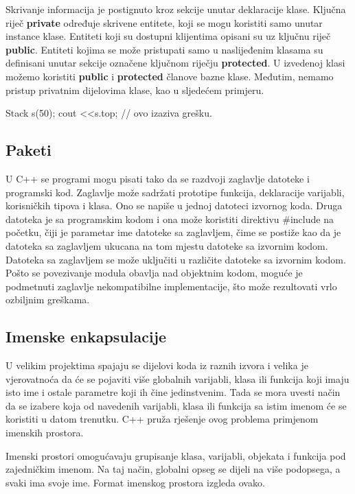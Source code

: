 \documentclass[11pt]{book}
\begin{document}
Skrivanje informacija je postignuto kroz sekcije unutar deklaracije klase. Ključna riječ \textbf{private} određuje skrivene entitete, koji se mogu koristiti samo unutar instance klase. Entiteti koji su dostupni klijentima opisani su uz ključnu riječ \textbf{public}. Entiteti kojima se može pristupati samo u naslijeđenim klasama su definisani unutar sekcije označene ključnom riječju \textbf{protected}.  U izvedenoj klasi možemo koristiti \textbf{public} i \textbf{protected} članove bazne klase.  Međutim, nemamo pristup privatnim dijelovima klase, kao u sljedećem primjeru.

\begin{shortlisting}
  Stack s(50);
  cout <<s.top; // ovo izaziva grešku.
\end{shortlisting}

\subsection{Paketi} %

U C++ se programi mogu pisati tako da se razdvoji zaglavlje datoteke i programski kod. Zaglavlje može sadržati prototipe funkcija, deklaracije varijabli, korisničkih tipova i klasa. Ono se napiše u jednoj datoteci izvornog koda. Druga datoteka je sa programskim kodom i ona može koristiti direktivu \#include na početku, čiji je parametar ime datoteke sa zaglavljem, čime se postiže kao da je datoteka sa zaglavljem ukucana na tom mjestu datoteke sa izvornim kodom. Datoteka sa zaglavljem se može uključiti u različite datoteke sa izvornim kodom. Pošto se povezivanje modula obavlja nad objektnim kodom, moguće je podmetnuti zaglavlje nekompatibilne implementacije, što može rezultovati vrlo ozbiljnim greškama.

\subsection{Imenske enkapsulacije}
U velikim projektima spajaju se dijelovi koda iz raznih izvora i velika je vjerovatnoća da će se pojaviti više globalnih varijabli, klasa ili funkcija koji imaju isto ime i ostale parametre koji ih čine jedinstvenim. Tada se mora uvesti način da se izabere koja od navedenih varijabli, klasa ili funkcija  sa istim imenom će se koristiti u datom trenutku. C++ pruža rješenje ovog problema primjenom imenskih prostora.

Imenski prostori omogućavaju grupisanje klasa, varijabli, objekata i funkcija pod zajedničkim imenom. Na taj način, globalni opseg se dijeli na više podopsega, a svaki ima svoje ime. Format imenskog prostora izgleda ovako.
\end{document}

